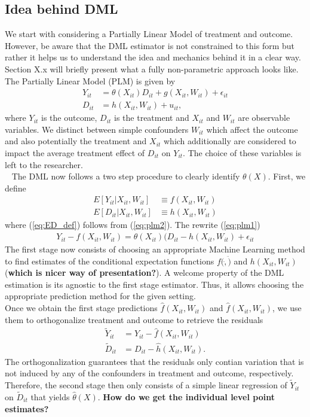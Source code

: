 \subsection{Idea behind DML}
We start with considering a Partially Linear Model of treatment and outcome. However, be aware that the DML estimator is not constrained to this form but rather it helps us to understand the idea and mechanics behind it in a clear way. Section X.x will briefly present what a fully non-parametric approach looks like. \\ 
The Partially Linear Model (PLM) is given by
\begin{align}
    Y_{it}&=\theta(X_{it})D_{it}+g(X_{it}, W_{it})+\epsilon_{it} \label{eq:plm1}\\
    D_{it}&=h(X_{it}, W_{it})+u_{it}, \label{eq:plm2}
\end{align}
where $Y_{it}$ is the outcome, $D_{it}$ is the treatment and $X_{it}$ and $W_{it}$ are observable variables. We distinct between simple confounders $W_{it}$ which affect the outcome and also potentially the treatment and $X_{it}$ which additionally are considered to impact the average treatment effect of $D_{it}$ on $Y_{it}$. The choice of these variables is left to the researcher. \\ 
The DML now follows a two step procedure to clearly identify $\theta(X)$. First, we define 
\begin{align}
    E[Y_{it}|X_{it}, W_{it}] &\equiv f(X_{it}, W_{it}) \label{eq:EY_def}\\ 
    E[D_{it}|X_{it}, W_{it}] &\equiv h(X_{it}, W_{it}) \label{eq:ED_def}
\end{align}
where (\ref{eq:ED_def}) follows from (\ref{eq:plm2}). The rewrite (\ref{eq:plm1}) 
\begin{align*}
    Y_{it}-f(X_{it}, W_{it})=\theta(X_{it})(D_{it} - h(X_{it}, W_{it})+\epsilon_{it}
\end{align*}
The first stage now consists of choosing an appropriate Machine Learning method to find estimates of the conditional expectation functions $f(\ddot, \ddot)$ and $h(X_{it}, W_{it})$ (\textbf{which is nicer way of presentation?}). A welcome property of the DML estimation is its agnostic to the first stage estimator. Thus, it allows choosing the appropriate prediction method for the given setting. \\
Once we obtain the first stage predictions $\hat{f}(X_{it}, W_{it})$ and $\hat{f}(X_{it}, W_{it})$, we use them to orthogonalize treatment and outcome to retrieve the residuals 
\begin{align*} 
    \tilde{Y}_{it}&=Y_{it}-\hat{f}(X_{it}, W_{it}) \\ 
    \tilde{D}_{it}&=D_{it}-\hat{h}(X_{it}, W_{it}).
\end{align*}
The orthogonalization guarantees that the residuals only contian variation that is not induced by any of the confounders in treatment and outcome, respectively. Therefore, the second stage then only consists of a simple linear regression of $\tilde{Y}_{it}$ on $\tilde{D}_{it}$ that yields $\hat{\theta}(X)$. \textbf{How do we get the individual level point estimates?}

